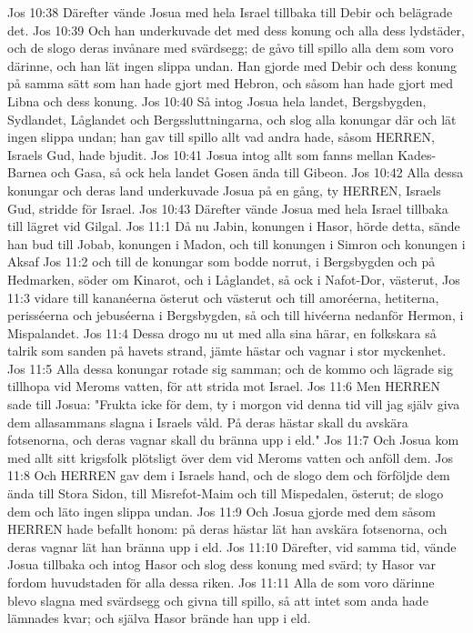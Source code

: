 Jos 10:38  Därefter vände Josua med hela Israel tillbaka till Debir och belägrade det.
Jos 10:39  Och han underkuvade det med dess konung och alla dess lydstäder, och de slogo deras invånare med svärdsegg; de gåvo till spillo alla dem som voro därinne, och han lät ingen slippa undan. Han gjorde med Debir och dess konung på samma sätt som han hade gjort med Hebron, och såsom han hade gjort med Libna och dess konung.
Jos 10:40  Så intog Josua hela landet, Bergsbygden, Sydlandet, Låglandet och Bergssluttningarna, och slog alla konungar där och lät ingen slippa undan; han gav till spillo allt vad andra hade, såsom HERREN, Israels Gud, hade bjudit.
Jos 10:41  Josua intog allt som fanns mellan Kades-Barnea och Gasa, så ock hela landet Gosen ända till Gibeon.
Jos 10:42  Alla dessa konungar och deras land underkuvade Josua på en gång, ty HERREN, Israels Gud, stridde för Israel.
Jos 10:43  Därefter vände Josua med hela Israel tillbaka till lägret vid Gilgal.
Jos 11:1  Då nu Jabin, konungen i Hasor, hörde detta, sände han bud till Jobab, konungen i Madon, och till konungen i Simron och konungen i Aksaf
Jos 11:2  och till de konungar som bodde norrut, i Bergsbygden och på Hedmarken, söder om Kinarot, och i Låglandet, så ock i Nafot-Dor, västerut,
Jos 11:3  vidare till kananéerna österut och västerut och till amoréerna, hetiterna, perisséerna och jebuséerna i Bergsbygden, så och till hivéerna nedanför Hermon, i Mispalandet.
Jos 11:4  Dessa drogo nu ut med alla sina härar, en folkskara så talrik som sanden på havets strand, jämte hästar och vagnar i stor myckenhet.
Jos 11:5  Alla dessa konungar rotade sig samman; och de kommo och lägrade sig tillhopa vid Meroms vatten, för att strida mot Israel.
Jos 11:6  Men HERREN sade till Josua: "Frukta icke för dem, ty i morgon vid denna tid vill jag själv giva dem allasammans slagna i Israels våld. På deras hästar skall du avskära fotsenorna, och deras vagnar skall du bränna upp i eld."
Jos 11:7  Och Josua kom med allt sitt krigsfolk plötsligt över dem vid Meroms vatten och anföll dem.
Jos 11:8  Och HERREN gav dem i Israels hand, och de slogo dem och förföljde dem ända till Stora Sidon, till Misrefot-Maim och till Mispedalen, österut; de slogo dem och läto ingen slippa undan.
Jos 11:9  Och Josua gjorde med dem såsom HERREN hade befallt honom: på deras hästar lät han avskära fotsenorna, och deras vagnar lät han bränna upp i eld.
Jos 11:10  Därefter, vid samma tid, vände Josua tillbaka och intog Hasor och slog dess konung med svärd; ty Hasor var fordom huvudstaden för alla dessa riken.
Jos 11:11  Alla de som voro därinne blevo slagna med svärdsegg och givna till spillo, så att intet som anda hade lämnades kvar; och själva Hasor brände han upp i eld.
